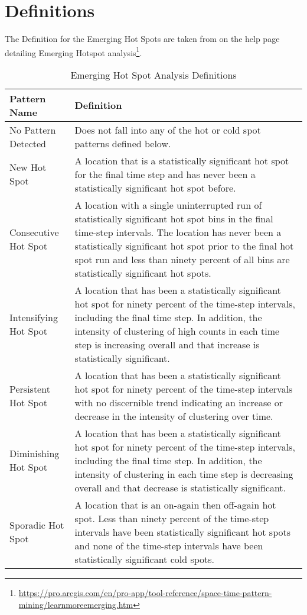 \chapter{Definitions}
\label{Definition_appendix}

The Definition for the Emerging Hot Spots are taken from \cite{Esri} on the help page detailing Emerging Hotspot analysis\footnote{\url{https://pro.arcgis.com/en/pro-app/tool-reference/space-time-pattern-mining/learnmoreemerging.htm}}. 

\begin{longtable}{|l|p{10cm}|}
\caption{Emerging Hot Spot Analysis Definitions} 
\label{App:EmergingHotspotdef}
\endfirsthead
\caption{Emerging Hot Spot Analysis Definitions} 
\endhead
\hline
Pattern Name & Definition \\ \hline
No Pattern Detected & Does not fall into any of the hot or cold spot patterns defined below. \\ \hline
New Hot Spot & A location that is a statistically significant hot spot for the final time step and has never been a statistically significant hot spot before. \\ \hline
Consecutive Hot Spot & A location with a single uninterrupted run of statistically significant hot spot bins in the final time-step intervals. The location has never been a statistically significant hot spot prior to the final hot spot run and less than ninety percent of all bins are statistically significant hot spots. \\ \hline
Intensifying Hot Spot & A location that has been a statistically significant hot spot for ninety percent of the time-step intervals, including the final time step. In addition, the intensity of clustering of high counts in each time step is increasing overall and that increase is statistically significant. \\ \hline
Persistent Hot Spot & A location that has been a statistically significant hot spot for ninety percent of the time-step intervals with no discernible trend indicating an increase or decrease in the intensity of clustering over time. \\ \hline
Diminishing Hot Spot & A location that has been a statistically significant hot spot for ninety percent of the time-step intervals, including the final time step. In addition, the intensity of clustering in each time step is decreasing overall and that decrease is statistically significant. \\ \hline
Sporadic Hot Spot & A location that is an on-again then off-again hot spot. Less than ninety percent of the time-step intervals have been statistically significant hot spots and none of the time-step intervals have been statistically significant cold spots. \\ \hline

\end{longtable}
